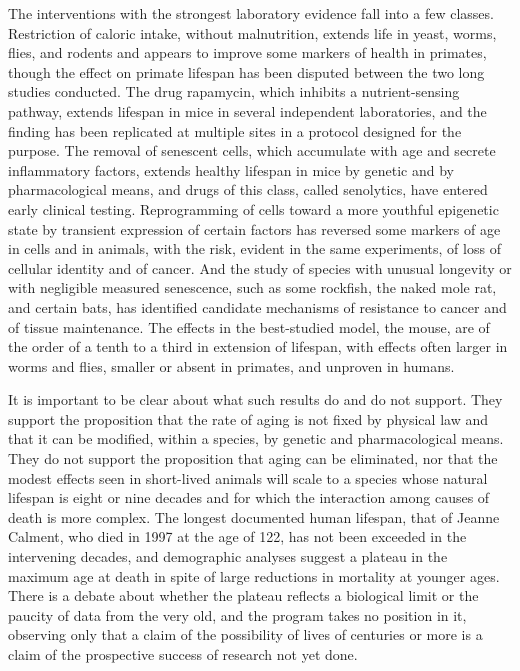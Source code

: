 The interventions with the strongest laboratory evidence fall into a few classes. Restriction of caloric intake, without malnutrition, extends life in yeast, worms, flies, and rodents and appears to improve some markers of health in primates, though the effect on primate lifespan has been disputed between the two long studies conducted. The drug rapamycin, which inhibits a nutrient-sensing pathway, extends lifespan in mice in several independent laboratories, and the finding has been replicated at multiple sites in a protocol designed for the purpose. The removal of senescent cells, which accumulate with age and secrete inflammatory factors, extends healthy lifespan in mice by genetic and by pharmacological means, and drugs of this class, called senolytics, have entered early clinical testing. Reprogramming of cells toward a more youthful epigenetic state by transient expression of certain factors has reversed some markers of age in cells and in animals, with the risk, evident in the same experiments, of loss of cellular identity and of cancer. And the study of species with unusual longevity or with negligible measured senescence, such as some rockfish, the naked mole rat, and certain bats, has identified candidate mechanisms of resistance to cancer and of tissue maintenance. The effects in the best-studied model, the mouse, are of the order of a tenth to a third in extension of lifespan, with effects often larger in worms and flies, smaller or absent in primates, and unproven in humans.

It is important to be clear about what such results do and do not support. They support the proposition that the rate of aging is not fixed by physical law and that it can be modified, within a species, by genetic and pharmacological means. They do not support the proposition that aging can be eliminated, nor that the modest effects seen in short-lived animals will scale to a species whose natural lifespan is eight or nine decades and for which the interaction among causes of death is more complex. The longest documented human lifespan, that of Jeanne Calment, who died in 1997 at the age of 122, has not been exceeded in the intervening decades, and demographic analyses suggest a plateau in the maximum age at death in spite of large reductions in mortality at younger ages. There is a debate about whether the plateau reflects a biological limit or the paucity of data from the very old, and the program takes no position in it, observing only that a claim of the possibility of lives of centuries or more is a claim of the prospective success of research not yet done.

